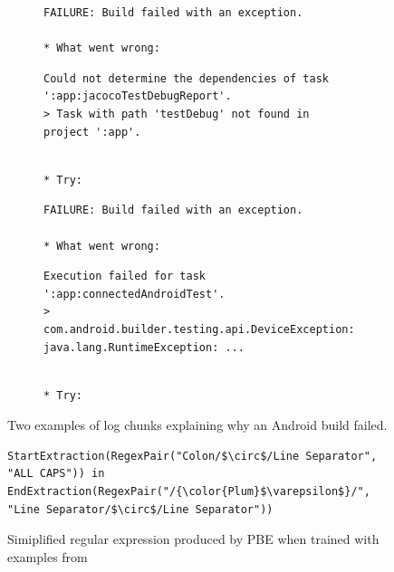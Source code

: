 \begin{figure}[!t]
  \centering
\begin{subfigure}[t]{\columnwidth}
  \begin{lstlisting}[breaklines=true,frame=tlr]
FAILURE: Build failed with an exception.

* What went wrong:
  \end{lstlisting}
  \vspace{-\baselineskip}
  \begin{lstlisting}[backgroundcolor=\color{Cerulean!60},breaklines=true,frame=rl]
Could not determine the dependencies of task ':app:jacocoTestDebugReport'.
> Task with path 'testDebug' not found in project ':app'.
  \end{lstlisting}
  \vspace{-\baselineskip}
  \begin{lstlisting}[breaklines=true,frame=blr]

* Try:
  \end{lstlisting}
\end{subfigure}\hspace{\fill}
\begin{subfigure}[t]{\columnwidth}
  \centering
  \begin{lstlisting}[breaklines=true,frame=tlr]
FAILURE: Build failed with an exception.

* What went wrong:
  \end{lstlisting}
  \vspace{-\baselineskip}
  \begin{lstlisting}[backgroundcolor=\color{Cerulean!60},breaklines=true,frame=rl]
Execution failed for task ':app:connectedAndroidTest'.
> com.android.builder.testing.api.DeviceException:
java.lang.RuntimeException: ...
  \end{lstlisting}
  \vspace{-\baselineskip}
  \begin{lstlisting}[breaklines=true,frame=blr]

* Try:
  \end{lstlisting}
\end{subfigure}
  \caption{Two examples of log chunks explaining why an Android
  build failed.}
  \label{lst:chunk-example}
\end{figure}

\begin{figure}[!t]
  \centering
  \begin{lstlisting}[breaklines=true]
StartExtraction(RegexPair("Colon/$\circ$/Line Separator",
"ALL CAPS")) in EndExtraction(RegexPair("/{\color{Plum}$\varepsilon$}/",
"Line Separator/$\circ$/Line Separator"))
  \end{lstlisting}
  \caption{Simiplified regular expression produced by PBE when trained
  with examples from }
  \label{lst:prose-program-simplified}
\end{figure}

